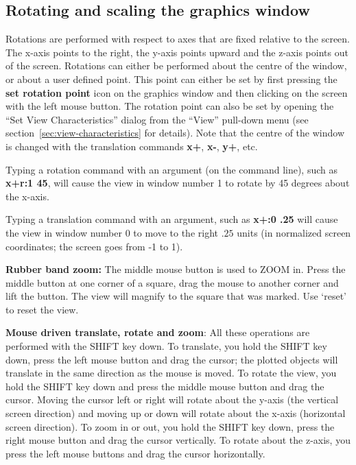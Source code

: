 \documentclass{article}
\begin{document}
\subsection{Rotating and scaling the graphics window}

Rotations are performed with respect to axes that are fixed relative
to the screen. The x-axis points to the right, the y-axis points
upward and the z-axis points out of the screen.  Rotations can either
be performed about the centre of the window, or about a user defined
point. This point can either be set by first pressing the {\bf set
rotation point} icon on the graphics window and then clicking on the
screen with the left mouse button. The rotation point can also be set
by opening the ``Set View Characteristics'' dialog from the ``View''
pull-down menu (see section~\protect\ref{sec:view-characteristics} for
details). Note that the centre of the window is changed with the
translation commands {\bf x+}, {\bf x-}, {\bf y+}, etc.

Typing a rotation command with an argument (on the command line), 
such as {\bf x+r:1 45}, will cause the view in window number 1 to 
rotate by 45 degrees about the x-axis.

Typing a translation command with an argument, such as {\bf x+:0 .25}
will cause the view in window number 0 to move to the right $.25$ units
(in normalized screen coordinates; the screen goes from -1 to 1).

{\bf Rubber band zoom:}  The middle mouse
button is used to ZOOM in. Press the middle button at one corner of a
square, drag the mouse to another corner and lift the button.  The
view will magnify to the square that was marked.  Use `reset' to reset
the view.

{\bf Mouse driven translate, rotate and zoom}:  All these operations are performed
with the SHIFT key down. To translate, you hold the SHIFT key down,
press the left mouse button and drag the cursor; the plotted objects
will translate in the same direction as the mouse is moved. To rotate
the view, you hold the SHIFT key down and press the middle mouse
button and drag the cursor. Moving the cursor left or right will
rotate about the y-axis (the vertical screen direction) and moving up
or down will rotate about the x-axis (horizontal screen direction). To
zoom in or out, you hold the SHIFT key down, press the right mouse
button and drag the cursor vertically. To rotate about the z-axis, you
press the left mouse buttons and drag the cursor horizontally.
\end{document}
